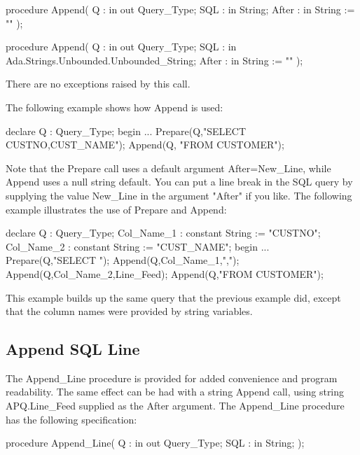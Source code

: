 \documentclass[english,letterpaper]{book}
\begin{document}
\begin{Code}
procedure Append(
   Q :     in out Query_Type;
   SQL :   in     String;
   After : in     String := ""
);
\end{Code}

\begin{Code}
procedure Append(
   Q :     in out Query_Type;
   SQL :   in     Ada.Strings.Unbounded.Unbounded_String;
   After : in     String := ""
);
\end{Code}

There are no exceptions raised by this call.

The following example shows how Append is used:

\begin{Example}
declare
   Q : Query_Type;
begin
   ...
   Prepare(Q,"SELECT CUSTNO,CUST_NAME");
   Append(Q, "FROM CUSTOMER");
\end{Example}

Note that the Prepare call uses a default argument After=New\_Line,
while Append uses a null string default.
You can put a line break in the SQL query by supplying the
value New\_Line in the argument "After" if you like.
The following example illustrates the use of Prepare and Append:

\begin{Example}
declare
   Q : Query_Type;
   Col_Name_1 : constant String := "CUSTNO";
   Col_Name_2 : constant String := "CUST_NAME";
begin
   ...
   Prepare(Q,"SELECT ");
   Append(Q,Col_Name_1,",");
   Append(Q,Col_Name_2,Line_Feed);
   Append(Q,"FROM CUSTOMER");
\end{Example}

This example builds up the same query that the previous example did,
except that the column names were provided by string variables.

\subsection{Append SQL Line\label{Append SQL Line}}

The Append\_Line procedure is provided for added convenience and program
readability. The same effect can be had with a string Append call,
using string APQ.Line\_Feed supplied as the After argument.
The Append\_Line procedure has the following specification:

\begin{Code}
procedure Append_Line(
   Q :   in out Query_Type;
   SQL : in     String;
);
\end{Code}
\end{document}
